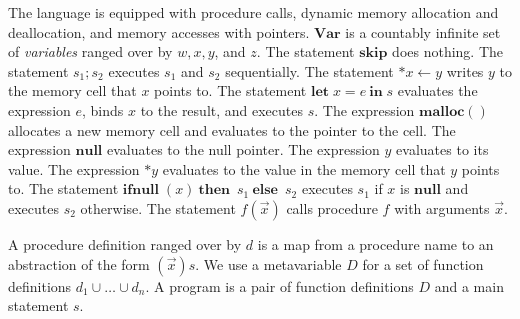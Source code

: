 \documentclass[english]{jssst_ppl} %
\newcommand\LET{\mathbf{let}\;}
\newcommand\IN{\mathbf{in}\;}
\newcommand\SKIP{\mathbf{skip}}
\newcommand\NULL{\mathbf{null}}
\newcommand\IFNULL{\mathbf{ifnull}\;}
\newcommand\THEN{\mathbf{then}\;}
\newcommand\ELSE{\mathbf{else}\;}
\newcommand\Malloc{\mathbf{malloc}}
\newcommand\Free{\mathbf{free}}
\newcommand\Cirx{(x)}
\theoremstyle{definition}
\begin{document}
The language is equipped with procedure calls, dynamic memory
allocation and deallocation, and memory accesses with pointers.
\(\mathbf{Var}\) is a countably infinite set of \emph{variables}
ranged over by \(w, x, y\), and \(z\).  The statement \(\SKIP\) does
nothing.  The statement \(s_1;s_2\) executes \(s_1\) and \(s_2\)
sequentially.  The statement \(*x \leftarrow y\) writes \(y\) to the
memory cell that \(x\) points to.  The statement \(\LET x = e\ \IN s\)
evaluates the expression \(e\), binds \(x\) to the result, and
executes \(s\).  The expression \(\Malloc()\) allocates a new memory
cell and evaluates to the pointer to the cell.  The expression
\(\NULL\) evaluates to the null pointer.  The expression \(y\)
evaluates to its value.  The expression \(*y\) evaluates to the value
in the memory cell that \(y\) points to.  The statement
\(\IFNULL(x)\ \THEN\ s_1\ \ELSE\ s_2\) executes \(s_1\) if \(x\) is
\(\NULL\) and executes \(s_2\) otherwise.  The statement
\(f(\vec{x})\) calls procedure \(f\) with arguments \(\vec{x}\).

A procedure definition ranged over by \(d\) is a map from a procedure
name to an abstraction of the form \((\vec{x})s\).  We use a
metavariable \(D\) for a set of function definitions \(d_1 \cup \dots
\cup d_n\).  A program is a pair of function definitions \(D\) and a
main statement \(s\).

\end{document}
